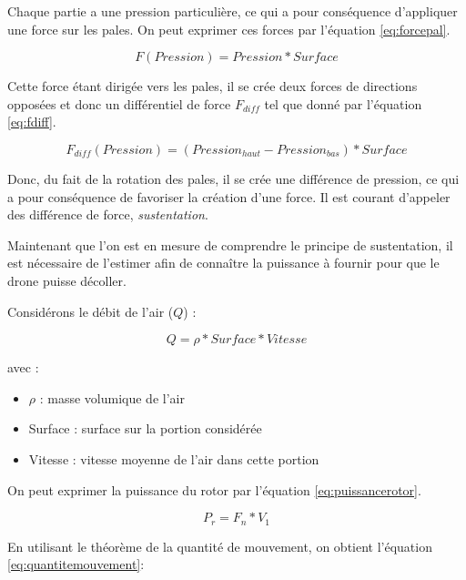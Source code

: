 \documentclass[a4paper,10pt]{report}
\begin{document}
	Chaque partie a une pression particulière, ce qui a pour conséquence 
d'appliquer une force sur les pales. On peut exprimer ces forces par l'équation 
\ref{eq:forcepal}.

	\begin{equation}
	  \label{eq:forcepal}
	  F(Pression) = Pression * Surface 
	\end{equation}

	Cette force étant dirigée vers les pales, il se crée deux forces de 
directions opposées et donc un différentiel de force $F_{diff}$ tel que donné 
par l'équation \ref{eq:fdiff}.

	\begin{equation}
	  \label{eq:fdiff}
	  F_{diff}(Pression) = (Pression_{haut} - Pression_{bas}) * Surface
	\end{equation}

	Donc, du fait de la rotation des pales, il se crée une différence de 
pression, ce qui a pour conséquence de favoriser la création d'une force. 
Il est courant d'appeler des différence de force, \textit{sustentation}.

	Maintenant que l'on est en mesure de comprendre le principe de 
sustentation, il est nécessaire de l'estimer afin de connaître la 
puissance à fournir pour que le drone puisse décoller. 

	Considérons le débit de l'air ($Q$) :
	
	\begin{equation}
	  \label{eq:debit}
	  Q = \rho * Surface * Vitesse
	\end{equation}
	
	avec :
	
	\begin{itemize}
	  \item $\rho$ : masse volumique de l'air
	  \item Surface : surface sur la portion considérée
	  \item Vitesse : vitesse moyenne de l'air dans cette portion
	\end{itemize}
	
	On peut exprimer la puissance du rotor par l'équation 
\ref{eq:puissancerotor}.
	
	\begin{equation}
	  \label{eq:puissancerotor}
	  P_{r} = F_{n} * V_{1} 
	\end{equation}
	
	En utilisant le théorème de la quantité de 
mouvement\cite{thquantmouvement}, on obtient l'équation 
\ref{eq:quantitemouvement}:
\end{document}
